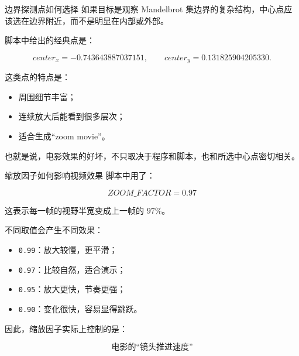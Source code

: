 \documentclass[aspectratio=169,11pt]{ctexbeamer}
\begin{document}
\begin{frame}[fragile]{边界探测点如何选择}
如果目标是观察 Mandelbrot 集边界的复杂结构，中心点应该选在边界附近，而不是明显在内部或外部。

\vspace{0.5em}
脚本中给出的经典点是：

\[
center_x = -0.743643887037151,\qquad
center_y = 0.131825904205330.
\]

\vspace{0.5em}
这类点的特点是：

\begin{itemize}
  \item 周围细节丰富；
  \item 连续放大后能看到很多层次；
  \item 适合生成“zoom movie”。
\end{itemize}

\vspace{0.5em}
也就是说，电影效果的好坏，不只取决于程序和脚本，也和所选中心点密切相关。
\end{frame}

\begin{frame}[fragile]{缩放因子如何影响视频效果}
脚本中用了：

\[
ZOOM\_FACTOR = 0.97
\]

这表示每一帧的视野半宽变成上一帧的 \(97\%\)。

\vspace{0.5em}
不同取值会产生不同效果：

\begin{itemize}
  \item \texttt{0.99}：放大较慢，更平滑；
  \item \texttt{0.97}：比较自然，适合演示；
  \item \texttt{0.95}：放大更快，节奏更强；
  \item \texttt{0.90}：变化很快，容易显得跳跃。
\end{itemize}

\vspace{0.5em}
因此，缩放因子实际上控制的是：

\[
\boxed{\text{电影的“镜头推进速度”}}
\]
\end{frame}
\end{document}

